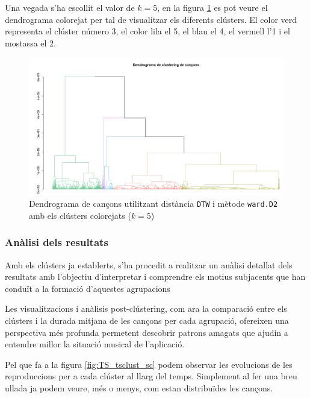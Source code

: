 \documentclass{article}
\begin{document}
Una vegada s'ha escollit el valor de $k = 5$, en la figura \ref{fig:TS_dendrograma_colors} es pot veure el dendrograma colorejat per tal de visualitzar els diferents clústers. El color verd representa el clúster número 3, el color lila el 5, el blau el 4, el vermell l'1 i el mostassa el 2.

\begin{figure}[H]
    \centering
    \includegraphics[width=\textwidth]{Images/4_clustering/time_series/dendrograma_colors.png}
    \caption{Dendrograma de cançons utilitzant distància \texttt{DTW} i mètode \texttt{ward.D2} amb els clústers colorejats ($k = 5$)}
    \label{fig:TS_dendrograma_colors}
\end{figure}

\subsubsection{Anàlisi dels resultats}

Amb els clústers ja establerts, s'ha procedit a realitzar un anàlisi detallat dels resultats amb l'objectiu d'interpretar i comprendre els motius subjacents que han conduït a la formació d'aquestes agrupacions

Les visualitzacions i anàlisis post-clústering, com ara la comparació entre els clústers i la durada mitjana de les cançons per cada agrupació, ofereixen una perspectiva més profunda permetent descobrir patrons amagats que ajudin a entendre millor la situació musical de l'aplicació.

Pel que fa a la figura \ref{fig:TS_tsclust_sc} podem observar les evolucions de les reproduccions per a cada clúster al llarg del temps.  Simplement al fer una breu ullada ja podem veure, més o menys, com estan distribuïdes les cançons. \\
\end{document}
